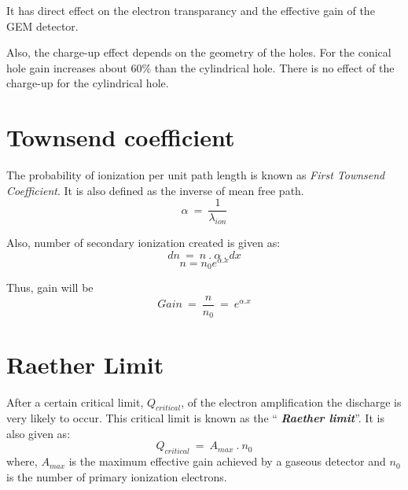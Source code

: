 It has direct effect on the electron transparancy and the effective gain of the GEM detector.

Also, the charge-up effect depends on the geometry of the holes.
For the conical hole gain increases about 60\% than the cylindrical hole. There is no effect of the charge-up for the cylindrical hole.



\section{Townsend coefficient} %
\label{sec:townsend_coefficient}
The probability of ionization per unit path length is known as \textit{First Townsend Coefficient}. It is also defined as the inverse of mean free path.
\begin{equation}
	\alpha~=~\frac{1}{\lambda_{ion}}
\end{equation}

Also, number of secondary ionization created is given as:
\begin{equation}
	dn~=~n~.~\alpha~.~dx
\end{equation}
\begin{equation}
	n=n_0 e^{\alpha.x}
\end{equation}

Thus, gain will be
\begin{equation}
	Gain~=~\frac{n}{n_0}~=~e^{\alpha.x}
\end{equation}

\section{Raether Limit} %
\label{sec:raether_limit}
After a certain critical limit, $Q_{critical}$, of the electron amplification the discharge is very likely to occur. This critical limit is known as the ``\textit{ \textbf{Raether limit}}''.
It is also given as:
\begin{equation}
	Q_{critical}~=~A_{max}~.~n_0
\end{equation}
where, $A_{max}$ is the maximum effective gain achieved by a gaseous detector and $n_0$ is the number of primary ionization electrons.

